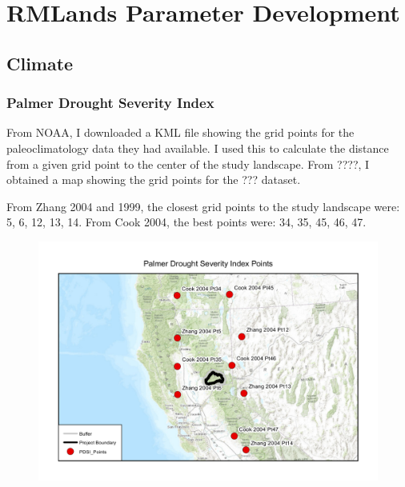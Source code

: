 \chapter{RMLands Parameter Development}
\section{Climate}
\subsection{Palmer Drought Severity Index}
From NOAA, I downloaded a KML file showing the grid points for the paleoclimatology data they had available. I used this to calculate the distance from a given grid point to the center of the study landscape. From ????, I obtained a map showing the grid points for the ??? dataset.

From Zhang 2004 and 1999, the closest grid points to the study landscape were: 5, 6, 12, 13, 14. From Cook 2004, the best points were: 34, 35, 45, 46, 47.

\begin{figure}[h]
\centering
\includegraphics[width=\textwidth]{PDSIPointMap}
\end{figure}

